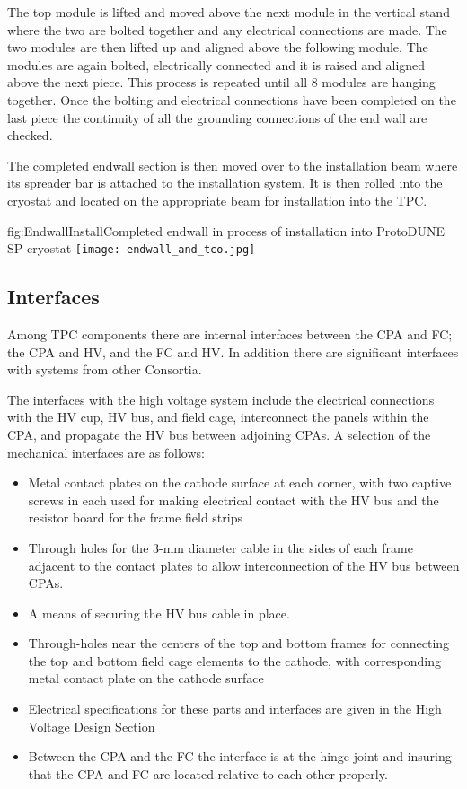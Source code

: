 The top module is lifted and moved above the next module in the vertical stand where the two are bolted together and any electrical connections are made. The two modules are then lifted up and aligned above the following module.  The modules are again bolted, electrically connected and it is raised and aligned above the next piece.  This process is repeated until all 8 modules are hanging together.  Once the bolting and electrical connections have been completed on the last piece the continuity of all the grounding connections of the end wall are checked.
 
The completed endwall section is then moved over to the installation beam where its spreader bar is attached to the installation system.  It is then rolled into the cryostat and located on the appropriate beam for installation into the TPC.

\begin{dunefigure}{fig:EndwallInstall}{Completed endwall in process of installation into ProtoDUNE SP cryostat}
\texttt{[image: endwall\_and\_tco.jpg]}
\end{dunefigure}



\subsection{Interfaces}
\label{sec:fdsp-hv-interface}

Among TPC components there are internal interfaces between the CPA and FC; the CPA and HV, and  the FC and HV. In addition there are significant interfaces with systems from other Consortia.

The interfaces with the high voltage system include the electrical connections with the HV cup, HV bus, and field cage, interconnect the panels within the CPA, and propagate the HV bus between adjoining CPAs.  A selection of the mechanical interfaces are as follows:
\begin{itemize}
\item Metal contact plates on the cathode surface at each corner, with two captive screws in each used for making electrical contact with the HV bus and the resistor board for the frame field strips
\item Through holes for the 3-mm diameter cable in the sides of each frame adjacent to the contact plates to allow interconnection of the HV bus between CPAs.
\item A means of securing the HV bus cable in place.
\item Through-holes near the centers of the top and bottom frames for connecting the top and bottom field cage elements to the cathode, with corresponding metal contact plate on the cathode surface
\item Electrical specifications for these parts and interfaces are given in the High Voltage Design Section
\item Between the CPA and the FC the interface is at the hinge joint and insuring that the CPA and FC are located relative to each other properly.
\end{itemize}

